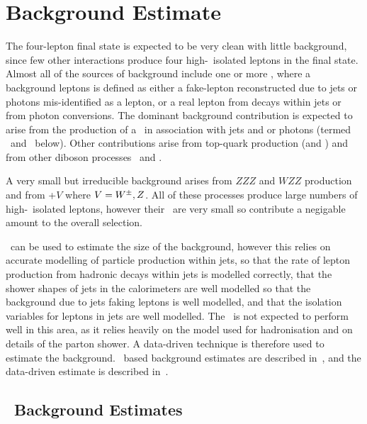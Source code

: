 \graphicspath{{Chapters/BackgroundEstimate/Figures/}}
\chapter{Background Estimate}
\label{chap:BackgroundEstimate}

The four-lepton final state is expected to be very clean with little
background, since few other interactions produce four high-\pt\ isolated leptons
in the final state. Almost all of the sources of background include one or more
, where a background
leptons is defined as either a fake-lepton reconstructed due to jets or
photons mis-identified as a lepton, or a real lepton from decays within jets or
from photon conversions.
The dominant background contribution is expected to arise from the production of a \Z\ in
association with jets and or photons (termed \Zjets\ and \Zgamma\ below). Other
contributions arise from top-quark production (\ttbar and \singletop) and from
other diboson processes \WW\ and \WZ.

A very small but irreducible background arises from $ZZZ$ and $WZZ$ production
and from \ttbar+$V$ where $V=W^{\pm},Z$.
All of these processes produce large numbers of high-\pt\ isolated leptons,
however their \cx\ are very small so contribute a negigable amount to the
overall selection.


\mcsim\ can be used to estimate the size of the background, however this relies
on accurate modelling of particle production within jets, so that the rate of
lepton production from hadronic decays within jets is modelled correctly, 
that the shower shapes of jets in the calorimeters are well modelled so that the
background due to jets faking leptons is well modelled, and that the isolation
variables for leptons in jets are well modelled. The \mc\ is not expected to
perform well in this area, as it relies heavily on the model used for
hadronisation and on details of the parton shower. A data-driven technique is
therefore used to estimate the background. \mc\ based background estimates are
described in~, and the data-driven estimate is described in~.

\section{\mc\ Background Estimates}
\label{sec:mcbg}


